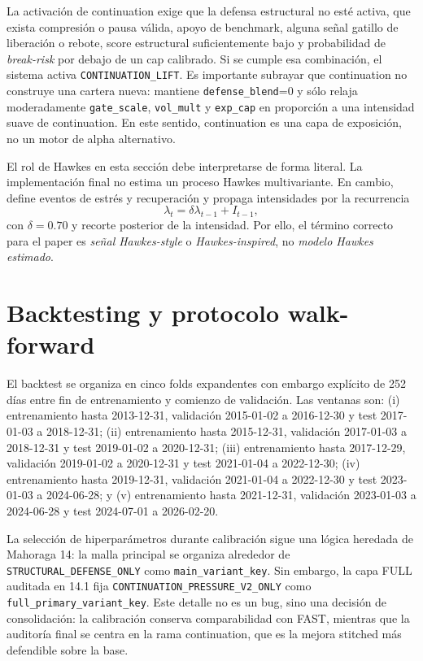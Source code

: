 \documentclass[11pt]{article}
\begin{document}
La activaci\'on de continuation exige que la defensa estructural no est\'e activa, que exista compresi\'on o pausa v\'alida, apoyo de benchmark, alguna se\~nal gatillo de liberaci\'on o rebote, score estructural suficientemente bajo y probabilidad de \textit{break-risk} por debajo de un cap calibrado. Si se cumple esa combinaci\'on, el sistema activa \texttt{CONTINUATION\_LIFT}. Es importante subrayar que continuation no construye una cartera nueva: mantiene \texttt{defense\_blend}=0 y s\'olo relaja moderadamente \texttt{gate\_scale}, \texttt{vol\_mult} y \texttt{exp\_cap} en proporci\'on a una intensidad suave de continuation. En este sentido, continuation es una capa de exposici\'on, no un motor de alpha alternativo.

El rol de Hawkes en esta secci\'on debe interpretarse de forma literal. La implementaci\'on final no estima un proceso Hawkes multivariante. En cambio, define eventos de estr\'es y recuperaci\'on y propaga intensidades por la recurrencia
\begin{equation}
\lambda_t = \delta \lambda_{t-1} + I_{t-1},
\end{equation}
con $\delta=0.70$ y recorte posterior de la intensidad. Por ello, el t\'ermino correcto para el paper es \textit{se\~nal Hawkes-style} o \textit{Hawkes-inspired}, no \textit{modelo Hawkes estimado}.

\section{Backtesting y protocolo walk-forward}
El backtest se organiza en cinco folds expandentes con embargo expl\'icito de 252 d\'ias entre fin de entrenamiento y comienzo de validaci\'on. Las ventanas son: (i) entrenamiento hasta 2013-12-31, validaci\'on 2015-01-02 a 2016-12-30 y test 2017-01-03 a 2018-12-31; (ii) entrenamiento hasta 2015-12-31, validaci\'on 2017-01-03 a 2018-12-31 y test 2019-01-02 a 2020-12-31; (iii) entrenamiento hasta 2017-12-29, validaci\'on 2019-01-02 a 2020-12-31 y test 2021-01-04 a 2022-12-30; (iv) entrenamiento hasta 2019-12-31, validaci\'on 2021-01-04 a 2022-12-30 y test 2023-01-03 a 2024-06-28; y (v) entrenamiento hasta 2021-12-31, validaci\'on 2023-01-03 a 2024-06-28 y test 2024-07-01 a 2026-02-20.

La selecci\'on de hiperpar\'ametros durante calibraci\'on sigue una l\'ogica heredada de Mahoraga 14: la malla principal se organiza alrededor de \texttt{STRUCTURAL\_DEFENSE\_ONLY} como \texttt{main\_variant\_key}. Sin embargo, la capa FULL auditada en 14.1 fija \texttt{CONTINUATION\_PRESSURE\_V2\_ONLY} como \texttt{full\_primary\_variant\_key}. Este detalle no es un bug, sino una decisi\'on de consolidaci\'on: la calibraci\'on conserva comparabilidad con FAST, mientras que la auditor\'ia final se centra en la rama continuation, que es la mejora stitched m\'as defendible sobre la base.
\end{document}
